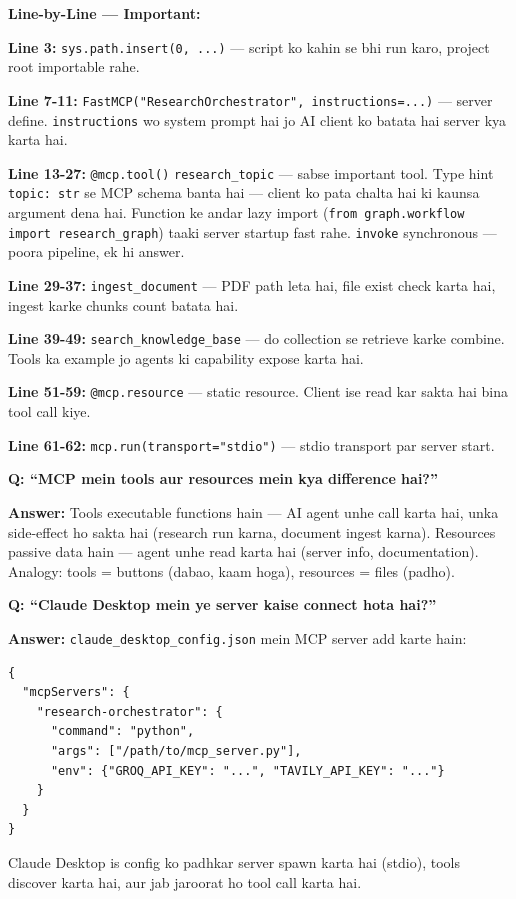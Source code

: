 \documentclass[11pt, a4paper]{article}
\begin{document}
\begin{codestorybox}
\textbf{Line-by-Line --- Important:}

\textbf{Line 3:} \texttt{sys.path.insert(0, ...)} --- script ko kahin se bhi run karo, project root importable rahe.

\textbf{Line 7-11:} \texttt{FastMCP("ResearchOrchestrator", instructions=...)} --- server define. \texttt{instructions} wo system prompt hai jo AI client ko batata hai server kya karta hai.

\textbf{Line 13-27:} \texttt{@mcp.tool()} \texttt{research\_topic} --- sabse important tool. Type hint \texttt{topic: str} se MCP schema banta hai --- client ko pata chalta hai ki kaunsa argument dena hai. Function ke andar lazy import (\texttt{from graph.workflow import research\_graph}) taaki server startup fast rahe. \texttt{invoke} synchronous --- poora pipeline, ek hi answer.

\textbf{Line 29-37:} \texttt{ingest\_document} --- PDF path leta hai, file exist check karta hai, ingest karke chunks count batata hai.

\textbf{Line 39-49:} \texttt{search\_knowledge\_base} --- do collection se retrieve karke combine. Tools ka example jo agents ki capability expose karta hai.

\textbf{Line 51-59:} \texttt{@mcp.resource} --- static resource. Client ise read kar sakta hai bina tool call kiye.

\textbf{Line 61-62:} \texttt{mcp.run(transport="stdio")} --- stdio transport par server start.
\end{codestorybox}

\begin{interviewbox}
\textbf{Q: ``MCP mein tools aur resources mein kya difference hai?''}

\textbf{Answer:} Tools executable functions hain --- AI agent unhe call karta hai, unka side-effect ho sakta hai (research run karna, document ingest karna). Resources passive data hain --- agent unhe read karta hai (server info, documentation). Analogy: tools = buttons (dabao, kaam hoga), resources = files (padho).
\end{interviewbox}

\begin{interviewbox}
\textbf{Q: ``Claude Desktop mein ye server kaise connect hota hai?''}

\textbf{Answer:} \texttt{claude\_desktop\_config.json} mein MCP server add karte hain:
\begin{lstlisting}[style=jsonstyle]
{
  "mcpServers": {
    "research-orchestrator": {
      "command": "python",
      "args": ["/path/to/mcp_server.py"],
      "env": {"GROQ_API_KEY": "...", "TAVILY_API_KEY": "..."}
    }
  }
}
\end{lstlisting}
Claude Desktop is config ko padhkar server spawn karta hai (stdio), tools discover karta hai, aur jab jaroorat ho tool call karta hai.
\end{interviewbox}
\end{document}
